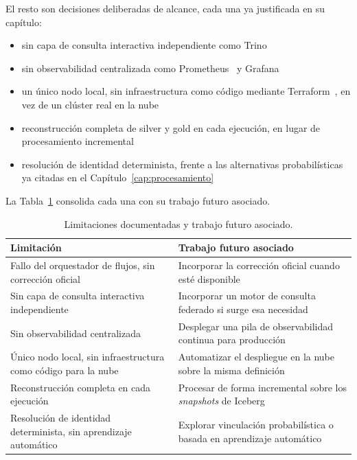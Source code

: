 El resto son decisiones deliberadas de alcance, cada una ya justificada en
su capítulo:

\begin{itemize}
  \sloppy
  \item sin capa de consulta interactiva independiente como
  Trino~\cite{trino_docs}
  \item sin observabilidad centralizada como Prometheus~\cite{prometheus_docs}
  y Grafana~\cite{grafana_docs}
  \item un único nodo local, sin infraestructura como código mediante
  Terraform~\cite{terraform_docs}, en vez de un clúster real en la nube
  \item reconstrucción completa de silver y gold en cada ejecución, en
  lugar de procesamiento incremental
  \item resolución de identidad determinista, frente a las alternativas
  probabilísticas ya citadas en el Capítulo~\ref{cap:procesamiento}
\end{itemize}

La Tabla~\ref{tab:tfm_conclusiones_limitaciones} consolida cada una con su
trabajo futuro asociado.

\begin{table}[H]
  \centering
  \footnotesize
  \renewcommand{\arraystretch}{1.0}
  \begin{tabular}{
    >{\raggedright\arraybackslash}p{}
    >{\raggedright\arraybackslash}p{}}
    \hline
    \textbf{Limitación} & \textbf{Trabajo futuro asociado} \\
    \hline
    Fallo del orquestador de flujos, sin corrección oficial & Incorporar la corrección oficial cuando esté disponible \\
    Sin capa de consulta interactiva independiente & Incorporar un motor de consulta federado si surge esa necesidad \\
    Sin observabilidad centralizada & Desplegar una pila de observabilidad continua para producción \\
    Único nodo local, sin infraestructura como código para la nube & Automatizar el despliegue en la nube sobre la misma definición \\
    Reconstrucción completa en cada ejecución & Procesar de forma incremental sobre los \textit{snapshots} de Iceberg \\
    Resolución de identidad determinista, sin aprendizaje automático & Explorar vinculación probabilística o basada en aprendizaje automático \\
    \hline
  \end{tabular}
  \caption{Limitaciones documentadas y trabajo futuro asociado.}
  \label{tab:tfm_conclusiones_limitaciones}
\end{table}

